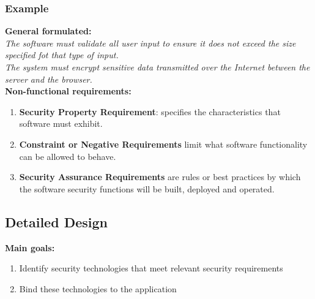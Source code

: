 \subsubsection{Example}
\textbf{General formulated:}\\
\textit{The software must validate all user input to ensure it does not exceed the size specified fot that type of input.}\\
\textit{The system must encrypt sensitive data transmitted over the Internet between the server and the browser.}\\
\textbf{Non-functional requirements:}\\
\begin{enumerate}
    \item \textbf{Security Property Requirement}: specifies the characteristics that software must exhibit.
    \item \textbf{Constraint or Negative Requirements} limit what software functionality can be allowed to behave.
    \item \textbf{Security Assurance Requirements} are rules or best practices by which the software security functions will be built, deployed and operated.
\end{enumerate}

\subsection{Detailed Design}
\textbf{Main goals:}\\
\begin{enumerate}
    \item Identify security technologies that meet relevant security requirements
    \item Bind these technologies to the application
\end{enumerate}

